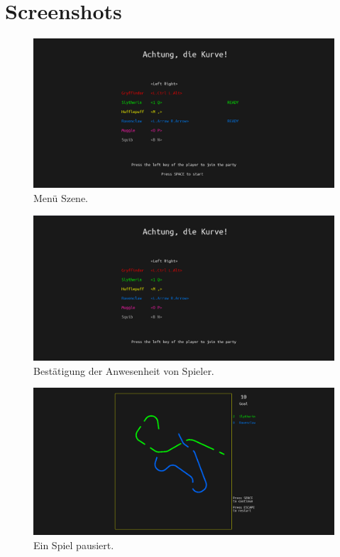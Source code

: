 \documentclass[doktyp=studarbeit]{TUBAFarbeiten}
\begin{document}
\section{Screenshots}
\begin{figure}[!htb]
	\centering
	\includegraphics[width=0.9\linewidth]{1.png}
	\caption{Menü Szene.}
	\label{fig:menu}
\end{figure}

\begin{figure}[!htb]
	\centering
	\includegraphics[width=0.9\linewidth]{2.png}
	\caption{Bestätigung der Anwesenheit von Spieler.}
	\label{fig:confirmation}
\end{figure}

\begin{figure}[!htb]
	\centering
	\includegraphics[width=0.9\linewidth]{3.png}
	\caption{Ein Spiel pausiert.}
	\label{fig:pause}
\end{figure}
\end{document}
